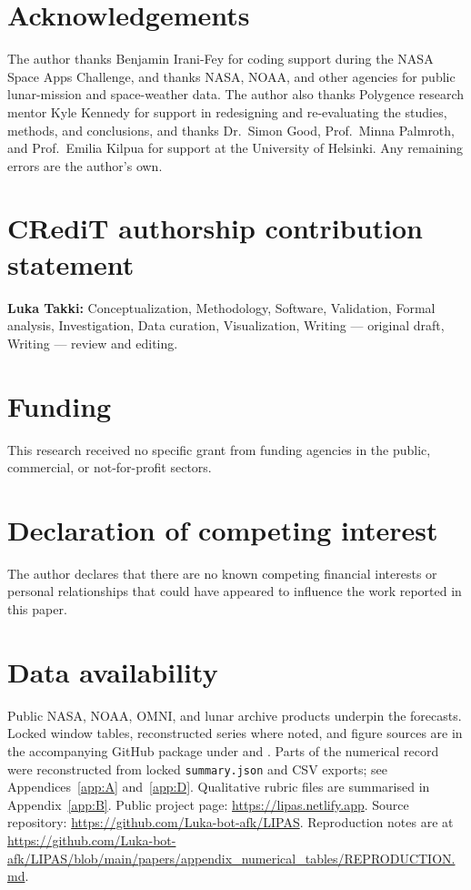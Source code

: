 \section*{Acknowledgements}

The author thanks Benjamin Irani-Fey for coding support during the NASA Space Apps Challenge, and thanks NASA, NOAA, and other agencies for public lunar-mission and space-weather data. The author also thanks Polygence research mentor Kyle Kennedy for support in redesigning and re-evaluating the studies, methods, and conclusions, and thanks Dr.~Simon Good, Prof.~Minna Palmroth, and Prof.~Emilia Kilpua for support at the University of Helsinki. Any remaining errors are the author's own.

\section*{CRediT authorship contribution statement}

\textbf{Luka Takki:} Conceptualization, Methodology, Software, Validation, Formal analysis, Investigation, Data curation, Visualization, Writing --- original draft, Writing --- review and editing.

\section*{Funding}

This research received no specific grant from funding agencies in the public, commercial, or not-for-profit sectors.

\section*{Declaration of competing interest}

The author declares that there are no known competing financial interests or personal relationships that could have appeared to influence the work reported in this paper.

\section*{Data availability}

\begin{sloppypar}
Public NASA, NOAA, OMNI, and lunar archive products underpin the forecasts.
Locked window tables, reconstructed series where noted, and figure sources are in the accompanying GitHub package under  and .
Parts of the numerical record were reconstructed from locked \texttt{summary.json} and CSV exports; see Appendices~\ref{app:A} and~\ref{app:D}.
Qualitative rubric files are summarised in Appendix~\ref{app:B}.
Public project page: \url{https://lipas.netlify.app}.
Source repository: \url{https://github.com/Luka-bot-afk/LIPAS}.
Reproduction notes are at \url{https://github.com/Luka-bot-afk/LIPAS/blob/main/papers/appendix_numerical_tables/REPRODUCTION.md}.
\end{sloppypar}

